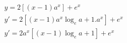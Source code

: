 \begin{ex}
\begin{align}
&y=2[(x-1)a^x]+e^x\nonumber\\
&y'=2[(x-1)a^x\log_{e}{a}+1.a^x]+e^x\nonumber\\
&y'=2a^x[(x-1)\log_{e}{a}+1]+e^x\nonumber
\end{align}
\end{ex}